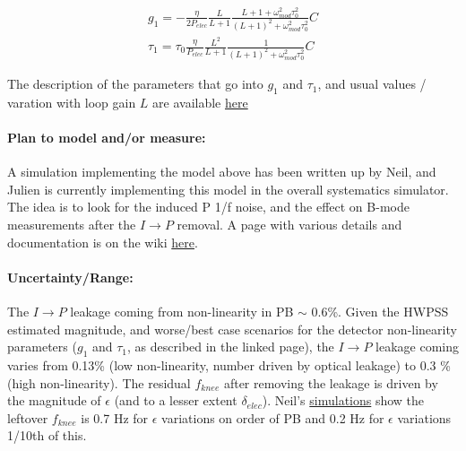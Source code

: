 \begin{align}
g_1 = -\frac{\eta}{2 P_{elec}} \frac{L}{L+1} \frac{L+1+\omega_{mod}^2 \tau_0^2}{(L+1)^2 + \omega_{mod}^2 \tau_0^2} C \\
\tau_1 = \tau_0 \frac{\eta}{P_{elec}} \frac{L^2}{L+1} \frac{1}{(L+1)^2 + \omega_{mod}^2 \tau_0^2} C
\end{align}

\noindent The description of the parameters that go into $g_1$ and $\tau_1$, and usual values / varation with loop gain $L$ are available \href{http://simonsobservatory.wdfiles.com/local--files/calandsys-telecon/hwp_systematics_pipeline_2017-05-17.pdf?ukey=b7162749d5391f6bfc1b0d7e0ed84ab97c96f6a8}{here}
  
\paragraph{Plan to model and/or measure:}
A simulation implementing the model above has been written up by Neil, and Julien is currently implementing this model in the overall systematics simulator. The idea is to look for the induced P 1/f noise, and the effect on B-mode measurements after the $I \rightarrow P$ removal. A page with various details and documentation is on the wiki \href{http://simonsobservatory.wikidot.com/estimationof-hwpss}{here}.


\paragraph{Uncertainty/Range:}
The $I \rightarrow P$ leakage coming from non-linearity in PB $\sim$ 0.6\%. Given the HWPSS estimated magnitude, and worse/best case scenarios for the detector non-linearity parameters ($g_1$ and $\tau_1$, as described in the linked page), the $I \rightarrow P$ leakage coming varies from 0.13\% (low non-linearity, number driven by optical leakage) to 0.3 \% (high non-linearity). The residual $f_{knee}$ after removing the leakage is driven by the magnitude of $\epsilon$ (and to a lesser extent $\delta_{elec}$). Neil's \href{http://simonsobservatory.wdfiles.com/local--files/estimationof-hwpss/Estimating_Ell_Knee_for_SOLA.pdf?ukey=886f3c1ad56d36de42412c02765a1a658a35fad9}{simulations} show the leftover $f_{knee}$ is 0.7 Hz for $\epsilon$ variations on order of PB and 0.2 Hz for $\epsilon$ variations 1/10th of this.


